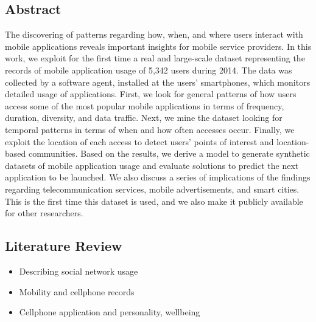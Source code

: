 \subsection{Abstract} 
The discovering of patterns regarding how, when, and where users interact with mobile applications reveals important insights for mobile service providers. In this work, we exploit for the first time a real and large-scale dataset representing the records of mobile application usage of 5,342 users during 2014. The data was collected by a software agent, installed at the users’ smartphones, which monitors detailed usage of applications. First, we look for general patterns of how users access some of the most popular mobile applications in terms of frequency, duration, diversity, and data traffic. Next, we mine the dataset looking for temporal patterns in terms of when and how often accesses occur. Finally, we exploit the location of each access to detect users’ points of interest and location-based communities. Based on the results, we derive a model to generate synthetic datasets of mobile application usage and evaluate solutions to predict the next application to be launched. We also discuss a series of implications of the findings regarding telecommunication services, mobile advertisements, and smart cities. This is the first time this dataset is used, and we also make it publicly available for other researchers.

\subsection{Literature Review} 
    \begin{itemize}
        \item Describing social network usage
        \item Mobility and cellphone records
        \item Cellphone application and personality, wellbeing 
    \end{itemize}
    
